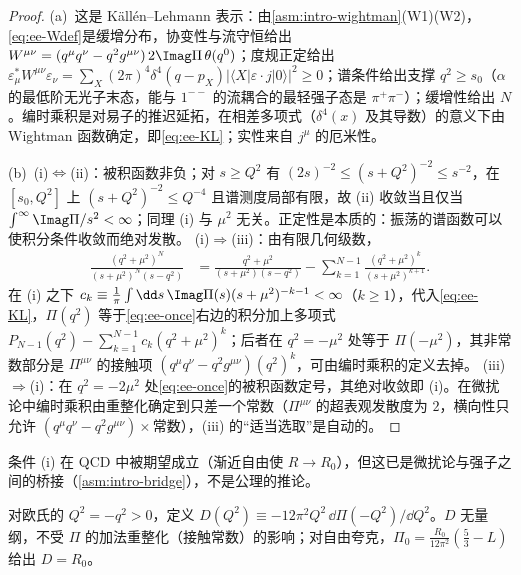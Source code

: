 \begin{proof}
(a)~这是 Källén--Lehmann 表示：由\cref{asm:intro-wightman}(W1)(W2)，\cref{eq:ee-Wdef}是缓增分布，协变性与流守恒给出 $W^{\mu\nu}=(q^\mu q^\nu-q^2g^{\mu\nu})\,2\Imag\Pi\,\theta(q^0)$；度规正定给出 $\varepsilon^*_\mu W^{\mu\nu}\varepsilon_\nu=\sum_X(2\pi)^4\delta^4(q-p_X)|\langle X|\varepsilon\cdot j|0\rangle|^2\ge0$；谱条件给出支撑 $q^2\ge s_0$（$\alpha$ 的最低阶无光子末态，能与 $1^{--}$ 的流耦合的最轻强子态是 $\pi^+\pi^-$）；缓增性给出 $N$。编时乘积是对易子的推迟延拓，在相差多项式（$\delta^4(x)$ 及其导数）的意义下由 Wightman 函数确定，即\cref{eq:ee-KL}；实性来自 $j^\mu$ 的厄米性。

(b)~(i)$\Leftrightarrow$(ii)：被积函数非负；对 $s\ge Q^2$ 有 $(2s)^{-2}\le(s+Q^2)^{-2}\le s^{-2}$，在 $[s_0,Q^2]$ 上 $(s+Q^2)^{-2}\le Q^{-4}$ 且谱测度局部有限，故 (ii) 收敛当且仅当 $\int^\infty\Imag\Pi/s^2<\infty$；同理 (i) 与 $\mu^2$ 无关。正定性是本质的：振荡的谱函数可以使积分条件收敛而绝对发散。
(i)$\Rightarrow$(iii)：由有限几何级数，
\begin{equation}\label{eq:ee-geom}
\begin{split}
\frac{(q^2+\mu^2)^N}{(s+\mu^2)^N(s-q^2)}&=\frac{q^2+\mu^2}{(s+\mu^2)(s-q^2)}-\sum_{k=1}^{N-1}\frac{(q^2+\mu^2)^k}{(s+\mu^2)^{k+1}} .
\end{split}
\end{equation}
在 (i) 之下 $c_k\equiv\frac1\pi\int\dd s\,\Imag\Pi(s)(s+\mu^2)^{-k-1}<\infty$（$k\ge1$），代入\cref{eq:ee-KL}，$\Pi(q^2)$ 等于\cref{eq:ee-once}右边的积分加上多项式 $P_{N-1}(q^2)-\sum_{k=1}^{N-1}c_k(q^2+\mu^2)^k$；后者在 $q^2=-\mu^2$ 处等于 $\Pi(-\mu^2)$，其非常数部分是 $\Pi^{\mu\nu}$ 的接触项 $(q^\mu q^\nu-q^2g^{\mu\nu})(q^2)^k$，可由编时乘积的定义去掉。
(iii)$\Rightarrow$(i)：在 $q^2=-2\mu^2$ 处\cref{eq:ee-once}的被积函数定号，其绝对收敛即 (i)。在微扰论中编时乘积由重整化确定到只差一个常数（$\Pi^{\mu\nu}$ 的超表观发散度为 $2$，横向性只允许 $(q^\mu q^\nu-q^2g^{\mu\nu})\times$常数），(iii) 的“适当选取”是自动的。
\end{proof}
条件 (i) 在 QCD 中被期望成立（渐近自由使 $R\to R_0$），但这已是微扰论与强子之间的桥接（\cref{asm:intro-bridge}），不是公理的推论。

\begin{definition}[Adler 函数]\label{def:ee-adler}
对欧氏的 $Q^2=-q^2>0$，定义 $D(Q^2)\equiv-12\pi^2Q^2\,\dd\Pi(-Q^2)/\dd Q^2$。$D$ 无量纲，不受 $\Pi$ 的加法重整化（接触常数）的影响；对自由夸克，$\Pi_0=\frac{R_0}{12\pi^2}(\frac53-L)$ 给出 $D=R_0$。
\end{definition}

